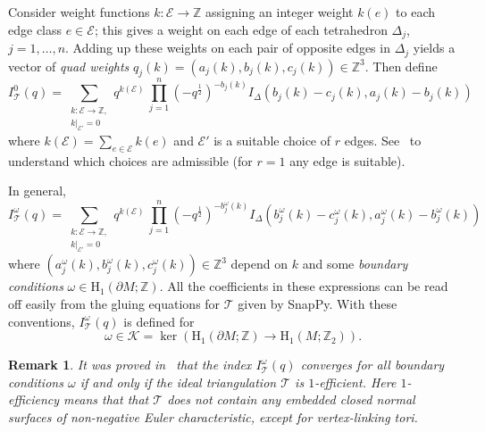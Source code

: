 \documentclass[11pt]{amsart}
\newtheorem{rmk}[thm]{Remark}
\newcommand{\E}{\mathcal{E}}
\newcommand{\T}{\mathcal{T}}
\newcommand{\bd}{\partial}
\newcommand{\Z}{\mathbb{Z}}
\newcommand{\tet}{I_{\Delta}}
\begin{document}
Consider weight functions $k : \E \to \Z$ assigning an integer weight $k\left(e\right)$ to each edge class $e\in \E$; this gives a weight on each edge of each tetrahedron $\Delta_j$, $j=1, \ldots, n$.  Adding up these weights on each pair of opposite edges in $\Delta_j$ yields a vector of {\em quad weights} $q_j\left(k\right) =\left(a_j\left(k\right),b_j\left(k\right),c_j\left(k\right)\right) \in \Z^3$.
Then define
\begin{equation}
I_\T^{0}\left(q\right)=  \sum_{\substack{k : \E \to \Z, \\ k|_{\E'}=0}}  q^{ k\left(\E\right) } \, \prod_{j=1}^n \left(-q^\frac12\right)^{-b_j\left(k\right)}\tet \left(b_j\left(k\right)-c_j\left(k\right), a_j\left(k\right)-b_j\left(k\right)\right)
\end{equation}
where $k\left(\E\right)=\sum_{e\in\E }  k\left(e\right)$ and $\E'$ is a suitable choice of $r$ edges. See~\cite[Sec.~4.6]{garoufalidis20151} to understand which choices are admissible (for $r=1$ any edge is suitable).

In general,
\begin{equation}
I_\T^\omega\left(q\right) =  \sum_{\substack{k : \E \to \Z, \\ k|_{\E'}=0}}  q^{ k\left(\E\right) } \, \prod_{j=1}^n \left(-q^\frac12\right)^{-b_j^\omega\left(k\right)}\tet \left(b_j^\omega\left(k\right) -c_j^\omega\left(k\right), a_j^\omega\left(k\right)-b_j^\omega\left(k\right)\right)
\end{equation}
where $\left(a_j^\omega\left(k\right),b_j^\omega\left(k\right),c_j^\omega\left(k\right)\right)  \in \Z^3$ depend on $k$ and some \textit{boundary conditions} $\omega \in \mathrm{H}_1\left(\bd M;\Z\right)$.
All the coefficients in these expressions can be read off easily from the gluing equations for $\T$ given by SnapPy.
With these conventions, $I_\T^\omega\left(q\right)$ is defined for
$$\omega \in \mathcal{K} = \ker\left( \mathrm{H}_1\left(\bd M ;\Z\right) \to \mathrm{H}_1\left(M; \Z_2\right)\right).$$

\begin{rmk}
It was proved in~\cite{garoufalidis20163d} that the index $I_\T^\omega\left(q\right)$ converges for all boundary conditions $\omega$ if and only if the ideal triangulation $\T$ is $1$-efficient. Here $1$-efficiency means that that $\T$ does not
contain any embedded closed normal surfaces of non-negative Euler characteristic, except
for vertex-linking tori.
\end{rmk}
\end{document}
